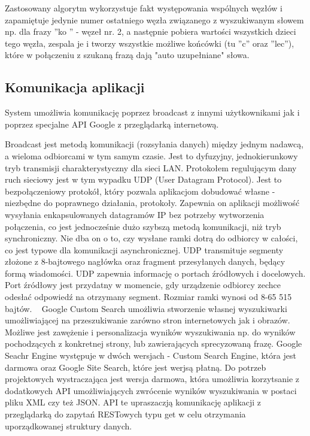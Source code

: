 \documentclass[twoside,a4paper]{book}
\begin{document}
Zastosowany algorytm wykorzystuje fakt występowania wspólnych węzłów i zapamiętuje jedynie numer ostatniego węzła związanego z wyszukiwanym słowem np. dla frazy ''ko
'' - węzeł nr. 2, a następnie pobiera wartości wszystkich dzieci tego węzła, zespala je i tworzy wszystkie możliwe końcówki (tu ''c'' oraz ''lec''), które w połączeniu z szukaną frazą dają "auto uzupełniane" słowa.
\subsection{Komunikacja aplikacji}
System umożliwia komunikację poprzez broadcast z innymi użytkownikami jak i poprzez specjalne API Google z przeglądarką internetową. 

Broadcast jest metodą komunikacji (rozsyłania danych) między jednym nadawcą, a wieloma odbiorcami w tym samym czasie. Jest to dyfuzyjny, jednokierunkowy tryb  transmisji charakterystyczny dla sieci LAN. Protokołem regulującym dany ruch sieciowy jest w tym wypadku UDP (User Datagram Protocol). Jest to bezpołączeniowy protokół, który pozwala aplikacjom dobudować własne - niezbędne do poprawnego działania, protokoły. 
Zapewnia on aplikacji możliwość wysyłania enkapsulowanych datagramów IP bez potrzeby wytworzenia połączenia, co jest jednocześnie dużo szybszą metodą komunikacji, niż tryb synchroniczny. Nie dba on o to, czy wysłane ramki dotrą do odbiorcy w całości, co jest typowe dla komunikacji asynchronicznej.
UDP transmituje segmenty złożone z 8-bajtowego nagłówka oraz fragment przesyłanych danych, będący formą wiadomości. 
UDP zapewnia informację o portach źródłowych i docelowych. 
Port źródłowy jest przydatny w momencie, gdy urządzenie odbiorcy zechce odesłać odpowiedź na otrzymany segment.
Rozmiar ramki wynosi od 8-65 515 bajtów. ~\cite{UDP}
\label{sec:customSearch}
Google Custom Search umożliwia stworzenie własnej wyszukiwarki umożliwiającej na przeszukiwanie zarówno stron internetowych jak i obrazów. Możliwe jest zawężenie i personalizacja wyników wyszukiwania np. do wyników pochodzących z konkretnej strony, lub zawierających sprecyzowaną frazę.  Google Seachr Engine występuje w dwóch wersjach - Custom Search Engine, która jest darmowa oraz Google Site Search, które jest werjsą płatną. Do potrzeb projektowych wystraczająca jest wersja darmowa, która umożliwia korzytsanie z dodatkowych API umożliwiających zwrócenie wyników wyszukiwania w postaci pliku XML czy też JSON. API te upraszaczją komunikację aplikacji z przeglądarką do zapytań RESTowych typu get w celu otrzymania uporządkowanej struktury danych. ~\cite{googleAPI}
\end{document}

